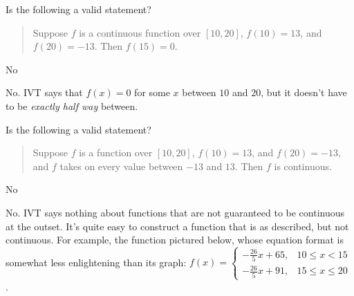 \begin{Mquestion} Is the following a valid statement?
\begin{quote} Suppose $f$ is a continuous function over $[10,20]$, $f(10)=13$, and $f(20)=-13$. Then $f(15)=0$.\end{quote}
\end{Mquestion}
\begin{answer} No
\end{answer}
\begin{solution} No. IVT says that $f(x)=0$ for some $x$ between $10$ and $20$, but it doesn't have to be \emph{exactly half way} between.
\end{solution}


\begin{Mquestion} Is the following a valid statement?
\begin{quote} Suppose $f$ is a function over $[10,20]$, $f(10)=13$, and $f(20)=-13$, and $f$ takes on every value between $-13$ and $13$. Then $f$ is continuous.\end{quote}
\end{Mquestion}
\begin{answer}  No
\end{answer}
\begin{solution} No. IVT says nothing about functions that are not guaranteed to be continuous at the outset. It's quite easy to construct a function that is as described, but not continuous. For example, the function pictured below, whose equation format is somewhat less enlightening than its graph: $f(x)=\left\{\begin{array}{ll}
-\frac{26}{5}x+65,&10 \leq x < 15\\
-\frac{26}{5}x+91,&15 \leq x \leq 20
\end{array}\right.$.
\begin{center}
\end{center}
\end{solution}


